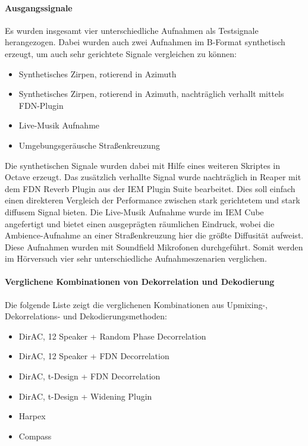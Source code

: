 \paragraph{Ausgangssignale}
Es wurden insgesamt vier unterschiedliche Aufnahmen als Testsignale herangezogen. Dabei wurden auch zwei Aufnahmen im B-Format synthetisch erzeugt, um auch sehr gerichtete Signale vergleichen zu können:

\begin{itemize}
	\item Synthetisches Zirpen, rotierend in Azimuth
	\item Synthetisches Zirpen, rotierend in Azimuth, nachträglich verhallt mittels FDN-Plugin
	\item Live-Musik Aufnahme
	\item Umgebungsgeräusche Straßenkreuzung
\end{itemize}

Die synthetischen Signale wurden dabei mit Hilfe eines weiteren Skriptes in Octave erzeugt. Das zusätzlich verhallte Signal wurde nachträglich in Reaper mit dem FDN Reverb Plugin aus der IEM Plugin Suite bearbeitet. Dies soll einfach einen direkteren Vergleich der Performance zwischen stark gerichtetem und stark diffusem Signal bieten. Die Live-Musik Aufnahme wurde im IEM Cube angefertigt und bietet einen ausgeprägten räumlichen Eindruck, wobei die Ambience-Aufnahme an einer Straßenkreuzung hier die größte Diffusität aufweist. Diese Aufnahmen wurden mit Soundfield Mikrofonen durchgeführt. Somit werden im Hörversuch vier sehr unterschiedliche Aufnahmeszenarien verglichen.

\paragraph{Verglichene Kombinationen von Dekorrelation und Dekodierung}

Die folgende Liste zeigt die verglichenen Kombinationen aus Upmixing-, Dekorrelations- und Dekodierungsmethoden:

\begin{itemize}
	\item DirAC, 12 Speaker + Random Phase Decorrelation
	\item DirAC, 12 Speaker + FDN Decorrelation
	\item DirAC, t-Design + FDN Decorrelation
	\item DirAC, t-Design + Widening Plugin
	\item Harpex
	\item Compass
\end{itemize}

